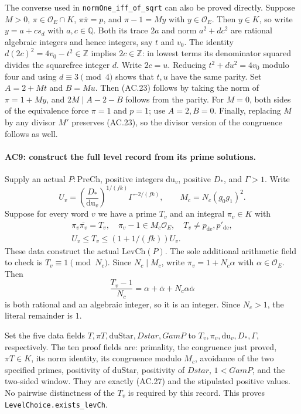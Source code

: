 The converse used in \texttt{normOne\_iff\_of\_sqrt} can also be
proved directly. Suppose $M>0$, $\pi\in\mathcal O_E\cap K$,
$\pi\overline\pi=p$, and $\pi-1=M y$ with $y\in\mathcal O_E$.
Then $y\in K$, so write $y=a+c s_d$ with $a,c\in\mathbb Q$.
Both its trace $2a$ and norm $a^2+dc^2$ are rational algebraic
integers and hence integers, say $t$ and $v_0$.
The identity $d(2c)^2=4v_0-t^2\in\mathbb Z$ implies
$2c\in\mathbb Z$: in lowest terms its denominator squared divides
the squarefree integer $d$. Write $2c=u$.
Reducing $t^2+du^2=4v_0$ modulo four and using $d\equiv3\pmod4$
shows that $t,u$ have the same parity. Set
$A=2+Mt$ and $B=Mu$. Then (AC.23) follows by taking the norm of
$\pi=1+My$, and $2M\mid A-2-B$ follows from the parity.
For $M=0$, both sides of the equivalence force $\pi=1$ and $p=1$;
use $A=2,B=0$. Finally, replacing $M$ by any divisor $M'$ preserves
(AC.23), so the divisor version of the congruence follows as well.

\paragraph{AC9: construct the full level record from its prime solutions.}
Supply an actual $P:\mathrm{PreCh}$, positive integers $\mathrm{du}_v$,
positive $D_*$, and $\Gamma>1$. Write
\[
 U_v=\left(\frac{D_*}{\mathrm{du}_v}\right)^{1/(fk)}
                         \Gamma^{-2/(fk)},\qquad
 M_c=N_c(g_0g_1)^2.                                         \tag{AC.26}
\]
Suppose for every word $v$ we have a prime $T_v$ and an integral
$\pi_v\in K$ with
\[
 \begin{gathered}
 \pi_v\overline{\pi_v}=T_v,\quad
 \pi_v-1\in M_c\mathcal O_E,\quad
 T_v\ne p_{\mathrm{de}},p'_{\mathrm{de}},\\
       U_v\leq T_v\leq(1+1/(fk))U_v.
 \end{gathered}                                              \tag{AC.27}
\]
These data construct the actual $\mathrm{LevCh}(P)$.
The sole additional arithmetic field to check is
$T_v\equiv1\pmod {N_c}$.
Since $N_c\mid M_c$, write $\pi_v=1+N_c\alpha$ with
$\alpha\in\mathcal O_E$. Then
\[
 \frac{T_v-1}{N_c}
       =\alpha+\overline\alpha+N_c\alpha\overline\alpha
\]
is both rational and an algebraic integer, so it is an integer.
Since $N_c>1$, the literal remainder is $1$.

Set the five data fields $T,\pi T,\mathrm{duStar},Dstar,GamP$
to $T_v,\pi_v,\mathrm{du}_v,D_*,\Gamma$, respectively.
The ten proof fields are: primality, the congruence just proved,
$\pi T\in K$, its norm identity, its congruence modulo $M_c$,
avoidance of the two specified primes, positivity of $\mathrm{duStar}$,
positivity of $Dstar$, $1<GamP$, and the two-sided window.
They are exactly (AC.27) and the stipulated positive values.
No pairwise distinctness of the $T_v$ is required by this record.
This proves \texttt{LevelChoice.exists\_levCh}.

